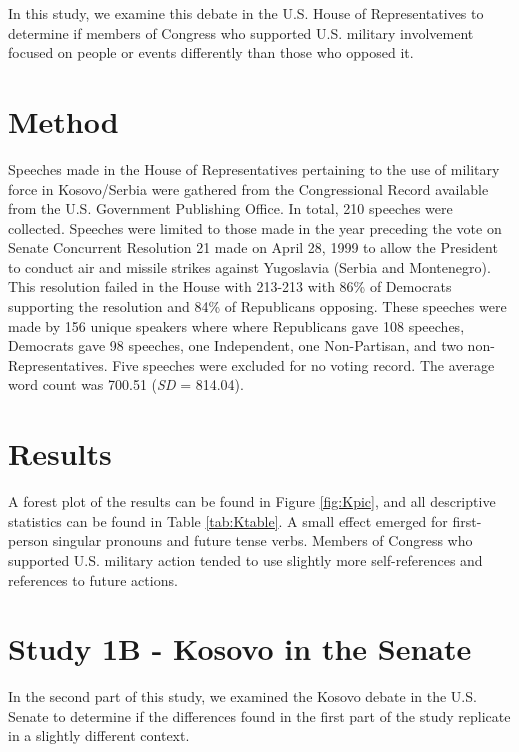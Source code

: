 \documentclass[english,,man]{apa6}
\theoremstyle{definition}
\theoremstyle{definition}
\theoremstyle{definition}
\theoremstyle{remark}
\begin{document}
In this study, we examine this debate in the U.S. House of
Representatives to determine if members of Congress who supported U.S.
military involvement focused on people or events differently than those
who opposed it.

\hypertarget{method-1}{%
\section{Method}\label{method-1}}

Speeches made in the House of Representatives pertaining to the use of
military force in Kosovo/Serbia were gathered from the Congressional
Record available from the U.S. Government Publishing Office. In total,
210 speeches were collected. Speeches were limited to those made in the
year preceding the vote on Senate Concurrent Resolution 21 made on April
28, 1999 to allow the President to conduct air and missile strikes
against Yugoslavia (Serbia and Montenegro). This resolution failed in
the House with 213-213 with 86\% of Democrats supporting the resolution
and 84\% of Republicans opposing. These speeches were made by 156 unique
speakers where where Republicans gave 108 speeches, Democrats gave 98
speeches, one Independent, one Non-Partisan, and two
non-Representatives. Five speeches were excluded for no voting record.
The average word count was 700.51 (\emph{SD} = 814.04).

\hypertarget{results}{%
\section{Results}\label{results}}

A forest plot of the results can be found in Figure \ref{fig:Kpic}, and
all descriptive statistics can be found in Table \ref{tab:Ktable}. A
small effect emerged for first-person singular pronouns and future tense
verbs. Members of Congress who supported U.S. military action tended to
use slightly more self-references and references to future actions.

\hypertarget{study-1b---kosovo-in-the-senate}{%
\section{Study 1B - Kosovo in the
Senate}\label{study-1b---kosovo-in-the-senate}}

In the second part of this study, we examined the Kosovo debate in the
U.S. Senate to determine if the differences found in the first part of
the study replicate in a slightly different context.
\end{document}
